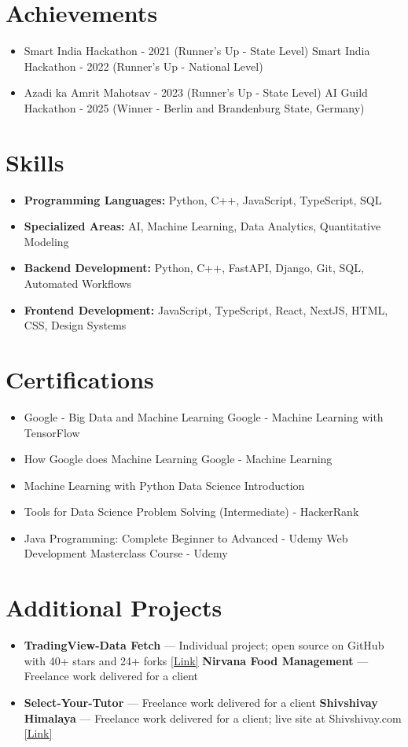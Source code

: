 \documentclass[a4paper,10pt]{article}
\begin{document}
\section*{Achievements}
\begin{itemize}
\item Smart India Hackathon - 2021 (Runner's Up - State Level) \hfill Smart India Hackathon - 2022 (Runner's Up - National Level)
\item Azadi ka Amrit Mahotsav - 2023 (Runner's Up - State Level) \hfill AI Guild Hackathon - 2025 (Winner - Berlin and Brandenburg State, Germany)
\end{itemize}

\section*{Skills}
\begin{itemize}
  \item \textbf{Programming Languages:} Python, C++, JavaScript, TypeScript, SQL
  \item \textbf{Specialized Areas:} AI, Machine Learning, Data Analytics, Quantitative Modeling
  \item \textbf{Backend Development:} Python, C++, FastAPI, Django, Git, SQL, Automated Workflows
  \item \textbf{Frontend Development:} JavaScript, TypeScript, React, NextJS, HTML, CSS, Design Systems
\end{itemize}

\section*{Certifications}
\begin{itemize}
\item Google - Big Data and Machine Learning \hfill Google - Machine Learning with TensorFlow
\item How Google does Machine Learning \hfill Google - Machine Learning
\item Machine Learning with Python \hfill Data Science Introduction
\item Tools for Data Science \hfill Problem Solving (Intermediate) - HackerRank
\item Java Programming: Complete Beginner to Advanced - Udemy \hfill Web Development Masterclass Course - Udemy
\end{itemize}

\section*{Additional Projects}
\begin{itemize}
\item \textbf{TradingView-Data Fetch} — Individual project; open source on GitHub with 40+ stars and 24+ forks \href{https://github.com/ravalmeet/TradingView}{[Link]} \hfill \textbf{Nirvana Food Management} — Freelance work delivered for a client
\item \textbf{Select-Your-Tutor} — Freelance work delivered for a client \hfill \textbf{Shivshivay Himalaya} — Freelance work delivered for a client; live site at Shivshivay.com \href{Shivshivay.com}{[Link]}
\end{itemize}
\end{document}
